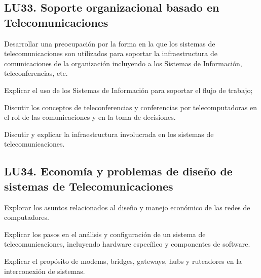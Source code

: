 \subsection{LU33. Soporte organizacional basado en Telecomunicaciones}\label{sec:BOK-LU33}\label{sec:LU33}
\begin{LearningUnit}
\begin{LUGoal}
\item Desarrollar una preocupación por la forma en la que los sistemas de telecomunicaciones son utilizados para soportar la infraestructura de comunicaciones de la organización incluyendo a los Sistemas de Información, teleconferencias, etc.
\end{LUGoal}

\begin{LUObjective}
\item Explicar el uso de los Sistemas de Información para soportar el flujo de trabajo;
\item Discutir los conceptos de teleconferencias y conferencias por telecomputadoras en el rol de las comunicaciones y en la toma de decisiones.
\item Discutir y explicar la infraestructura involucrada en los sistemas de telecomunicaciones.
\end{LUObjective}
\end{LearningUnit}

\subsection{LU34. Economía y problemas de diseño de sistemas de Telecomunicaciones}\label{sec:BOK-LU34}\label{sec:LU34}
\begin{LearningUnit}
\begin{LUGoal}
\item Explorar los asuntos relacionados al diseño y manejo económico de las redes de computadores.
\end{LUGoal}

\begin{LUObjective}
\item Explicar los pasos en el análisis y configuración de un sistema de telecomunicaciones, incluyendo hardware específico y componentes de software.
\item Explicar el propósito de modems, bridges, gateways, hubs y ruteadores en la interconexión de sistemas.
\end{LUObjective}
\end{LearningUnit}

